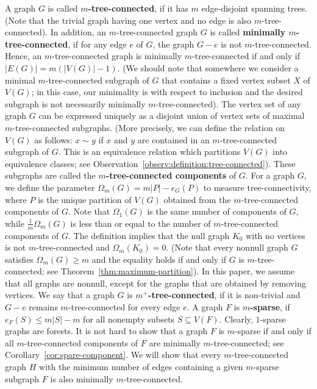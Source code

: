 \documentclass[10pt,bezier]{article}
\begin{document}
%
%
%
A graph $G$ is called {\bf$m$-tree-connected}, if it has $m$ edge-disjoint spanning trees. 
(Note that the trivial graph having one vertex and no edge is also $m$-tree-connected).
In addition, an $m$-tree-connected graph $G$ is called {\bf minimally $m$-tree-connected},
if for any edge $e$ of $G$, the graph $G- e$ is not $m$-tree-connected.
Hence, an $m$-tree-connected graph is minimally $m$-tree-connected if and only if $|E(G)|=m(|V(G)|-1)$. 
(We should note that somewhere we consider a minimal $m$-tree-connected subgraph of $G$ that contains a fixed vertex subset $X$ of $V(G)$; in this case, our minimality is with respect to inclusion and the desired subgraph is not necessarily minimally $m$-tree-connected).
The vertex set of any graph $G$ can be expressed uniquely as a disjoint union of vertex sets of maximal $m$-tree-connected subgraphs.
(More precisely, we can define the relation on $V (G)$ as follows: $x\sim y$ if $x$ and $y$ are contained in an $m$-tree-connected subgraph of $G$. This is an equivalence relation which partitions $V(G)$ into equivalence classes; see Observation~\ref{observ:definition:tree-connected}). These subgraphs are called the {\bf $m$-tree-connected components} of $G$.
%
%
For a graph $G$, we define the parameter $\Omega_m(G)=m|P|-e_G(P)$ to measure tree-connectivity, where $P$ is the unique partition of $V(G)$ obtained from the $m$-tree-connected components of $G$.
Note that $\Omega_1(G)$ is the same number of components of $G$, while $\frac{1}{m}\Omega_m(G)$ is less than or equal to the number of $m$-tree-connected components of $G$.
%
The definition implies that
the null 
graph $K_0$ with no vertices is not $m$-tree-connected and $\Omega_m(K_0)=0$.
(Note that every nonnull graph $G$ satisfies $\Omega_m(G)\ge m$ and the equality holds if and only if $G$ is $m$-tree-connected; see Theorem~\ref{thm:maximum-partition}).
%
In this paper, we assume that all graphs are nonnull, except for the graphs that are obtained by removing vertices.
We say that a graph $G$ is {\bf $m^+$-tree-connected}, if it is non-trivial and $G-e$ remains $m$-tree-connected for every edge $e$. 
%
A graph $F$ is {\bf $m$-sparse}, if $e_F(S)\le m|S|-m$ for all nonempty subsets $S\subseteq V(F)$. Clearly, $1$-sparse graphs are forests.
It is not hard to show that a graph $F$ is $m$-sparse if and only if all $m$-tree-connected components of $F$ are minimally $m$-tree-connected; see Corollary~\ref{cor:spare-component}.
%
%
We will show that every $m$-tree-connected graph $H$ with the minimum number of edges containing a given $m$-sparse subgraph $F$ 
 is also minimally $m$-tree-connected.
\end{document}
